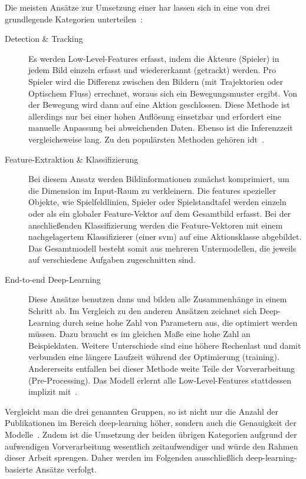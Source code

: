 Die meisten Ansätze zur Umsetzung einer \gls{har} lassen sich in eine von drei grundlegende Kategorien unterteilen~\cite{Rahmad18, Kothawade19}:

\begin{description}
    \item[Detection \& Tracking]
    Es werden Low-Level-Features erfasst, indem die Akteure (Spieler) in jedem Bild einzeln erfasst und wiedererkannt (getrackt) werden.
    Pro Spieler wird die Differenz zwischen den Bildern (\zB mit Trajektorien oder Optischem Fluss) errechnet, woraus sich ein Bewegungsmuster ergibt.
    Von der Bewegung wird dann auf eine Aktion geschlossen.
    Diese Methode ist allerdings nur bei einer hohen Auflösung einsetzbar und erfordert eine manuelle Anpassung bei abweichenden Daten.
    Ebenso ist die Inferenzzeit vergleichsweise lang.
    Zu den populärsten Methoden gehören \ua \gls{idt}~\cite{Wang13}.
    \item[Feature-Extraktion \& Klassifizierung]
    Bei diesem Ansatz werden Bildinformationen zunächst komprimiert, um die Dimension im Input-Raum zu verkleinern.
    Die \gls{feature}s spezieller Objekte, wie Spielfeldlinien, Spieler oder Spielstandtafel werden einzeln oder als ein globaler Feature-Vektor auf dem Gesamtbild erfasst.
    Bei der anschließenden Klassifizierung werden die Feature-Vektoren mit einem nachgelagertem Klassifizierer (\zB einer \gls{svm}) auf eine Aktionsklasse abgebildet.
    Das Gesamtmodell besteht somit aus mehreren Untermodellen, die jeweils auf verschiedene Aufgaben zugeschnitten sind.
    \item[End-to-end Deep-Learning]
    Diese Ansätze benutzen \glspl{dnn} und bilden alle Zusammenhänge in einem Schritt ab.
    Im Vergleich zu den anderen Ansätzen zeichnet sich Deep-Learning durch seine hohe Zahl von Parametern aus, die optimiert werden müssen.
    Dazu braucht es im gleichen Maße eine hohe Zahl an Beispieldaten.
    Weitere Unterschiede sind eine höhere Rechenlast und damit verbunden eine längere Laufzeit während der Optimierung (\gls{training}).
    Andererseits entfallen bei dieser Methode weite Teile der Vorverarbeitung (Pre-Processing).
    Das Modell erlernt alle Low-Level-Features stattdessen implizit mit~\cite{Rahmad18}.
\end{description}

Vergleicht man die drei genannten Gruppen, so ist nicht nur die Anzahl der Publikationen im Bereich \gls{deep-learning} höher, sondern auch die Genauigkeit der Modelle~\cite{Rahmad18}.
Zudem ist die Umsetzung der beiden übrigen Kategorien aufgrund der aufwendigen Vorverarbeitung wesentlich zeitaufwendiger und würde den Rahmen dieser Arbeit sprengen.
Daher werden im Folgenden ausschließlich \gls{deep-learning}-basierte Ansätze verfolgt.



